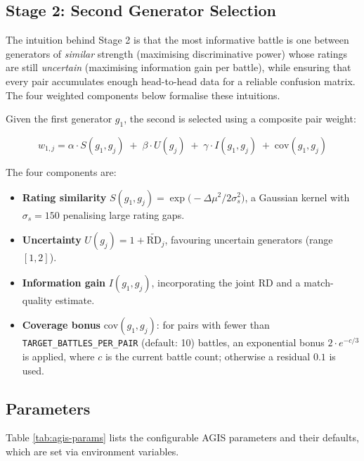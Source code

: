 \documentclass[shortabstract, mgr, english]{iithesis}
\begin{document}
\subsection{Stage 2: Second Generator Selection}
\label{subsec:sd-agis-stage2}

The intuition behind Stage 2 is that the most informative battle is one between
generators of \emph{similar} strength (maximising discriminative power) whose ratings
are still \emph{uncertain} (maximising information gain per battle), while ensuring
that every pair accumulates enough head-to-head data for a reliable confusion matrix.
The four weighted components below formalise these intuitions.

Given the first generator $g_1$, the second is selected using a composite pair weight:

\begin{equation}
\label{eq:agis-w2}
w_{1,j} = \alpha \cdot S(g_1, g_j) \;+\; \beta \cdot U(g_j) \;+\;
           \gamma \cdot I(g_1, g_j) \;+\; \text{cov}(g_1, g_j)
\end{equation}

The four components are:

\begin{itemize}
    \item \textbf{Rating similarity} $S(g_1, g_j) = \exp\!\bigl(-\Delta\mu^2 / 2\sigma_s^2\bigr)$,
          a Gaussian kernel with $\sigma_s = 150$ penalising large rating gaps.
    \item \textbf{Uncertainty} $U(g_j) = 1 + \widetilde{\text{RD}}_j$, favouring
          uncertain generators (range $[1, 2]$).
    \item \textbf{Information gain} $I(g_1, g_j)$, incorporating the joint RD
          and a match-quality estimate.
    \item \textbf{Coverage bonus} $\text{cov}(g_1, g_j)$: for pairs with fewer than
          \texttt{TARGET\_BATTLES\_PER\_PAIR} (default: 10) battles, an exponential
          bonus $2 \cdot e^{-c/3}$ is applied, where $c$ is the current battle count;
          otherwise a residual $0.1$ is used.
\end{itemize}

\subsection{Parameters}
\label{subsec:sd-agis-params}

Table \ref{tab:agis-params} lists the configurable AGIS parameters and their defaults,
which are set via environment variables.
\end{document}
